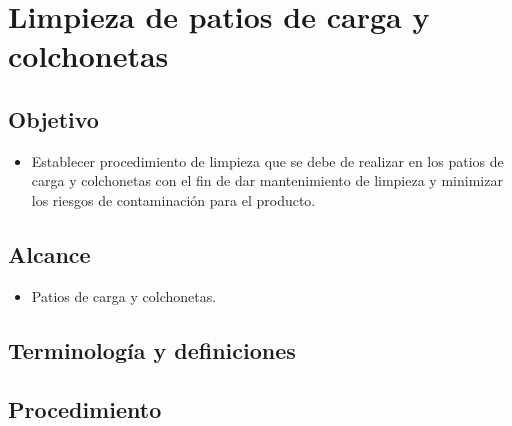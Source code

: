 \thispagestyle{formato-PI}
\renewcommand{\MenorVer}{0}
\renewcommand{\MayorVer}{2}
\renewcommand{\Codigo}{HYS-10-IT}
\renewcommand{\FechaPub}{2023--01}
\renewcommand{\Titulo}{Limpieza de patios de carga y colchonetas}

\section{\Titulo}

\subsection{Objetivo}

\begin{itemize}
	\item Establecer procedimiento de limpieza que se debe de realizar en los patios de carga y colchonetas con el fin de dar mantenimiento de limpieza y minimizar los riesgos de contaminación para el producto.
\end{itemize}

\subsection{Alcance}

\begin{itemize}
	\item Patios de carga y colchonetas.
\end{itemize}

\subsection{Terminología y definiciones}
\begin{description}
\end{description}



\subsection{Procedimiento}

